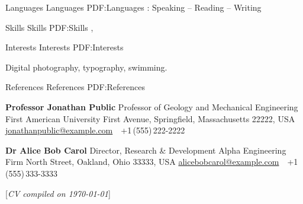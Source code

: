 \documentclass[letterpaper,MMMyyyy,nonstopmode]{simpleresumecv}
\newcommand{\CVNote}{CV compiled on {\today}}
\begin{document}
\begin{Body}





\Section
{Languages}
{Languages}
{PDF:Languages}
\Gap
\BulletItem
{} :
Speaking --
Reading --
Writing






\Section
{Skills}
{Skills}
{PDF:Skills}
\Entry
{}
,




\Section
{Interests}
{Interests}
{PDF:Interests}

\Entry
Digital photography,
typography,
swimming.


\Section
{References}
{References}
{PDF:References}

\BulletItem
\textbf{Professor Jonathan Public}
\newline
Professor of Geology and Mechanical Engineering
\newline
First American University
 First Avenue, Springfield, Massachusetts 22222, USA
\newline
\href{mailto:jonathanpublic@example.com}
{jonathanpublic@example.com}
\,\SubBulletSymbol\,
+1\,(555)\,222-2222

\BigGap
\BulletItem
\textbf{Dr Alice Bob Carol}
\newline
Director, Research \& Development
\newline
Alpha Engineering Firm
 North Street, Oakland, Ohio 33333, USA
\newline
\href{mailto:alicebobcarol@example.com}
{alicebobcarol@example.com}
\,\SubBulletSymbol\,
+1\,(555)\,333-3333



\end{Body}


\UseNoteFont%
\null\hfill%
[\textit{\CVNote}]
\end{document}
